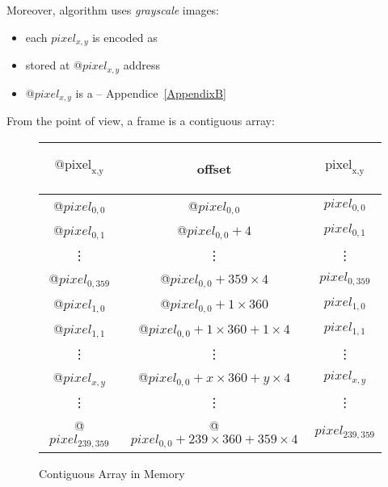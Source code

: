 Moreover, \flow{} algorithm uses \emph{grayscale} images:

\begin{itemize}
	\item each $pixel_{x,y}$ is encoded as 
	\item stored at @$pixel_{x,y}$ address
	\item @$pixel_{x,y}$ is a  -- Appendice~\ref{AppendixB}
\end{itemize}


From the \ram{} point of view, a frame is a contiguous array:
\begin{figure}[h]
\begin{center}
\begin{tabular}{|c|c|c|}

	\hline
	\begin{bf}$\text{@pixel}_\text{{x,y}}$\end{bf} & \begin{bf}offset\end{bf} & \begin{bf}$\text{pixel}_\text{{x,y}}$\end{bf} \\[10pt]

	\hline
	@$pixel_{0,0}$ & @$pixel_{0,0}$ & $pixel_{0,0}$ \\

	\hline
	@$pixel_{0,1}$ & @$pixel_{0,0} + 4$ & $pixel_{0,1}$ \\

	\hline
	\vdots & \vdots & \vdots \\

	\hline
	@$pixel_{0,359}$ & @$pixel_{0,0} + 359\times 4$ & $pixel_{0,359}$ \\

	\hline
	@$pixel_{1,0}$ & @$pixel_{0,0} + 1\times 360$ & $pixel_{1,0}$ \\

	\hline
	@$pixel_{1,1}$ & @$pixel_{0,0} + 1\times 360 + 1\times 4$ & $pixel_{1,1}$ \\

	\hline
	\vdots & \vdots & \vdots \\

	\hline
	\rowcolor{yellow}@$pixel_{x,y}$ & @$pixel_{0,0} + x\times 360 + y\times 4$ & $pixel_{x,y}$ \\

	\hline
	\vdots & \vdots & \vdots \\

	\hline
	@$pixel_{239,359}$ & @$pixel_{0,0} + 239\times 360 + 359\times 4$ & $pixel_{239,359}$ \\

	\hline

\end{tabular}
\end{center}
\caption{Contiguous Array in Memory}
\end{figure}
\FloatBarrier

